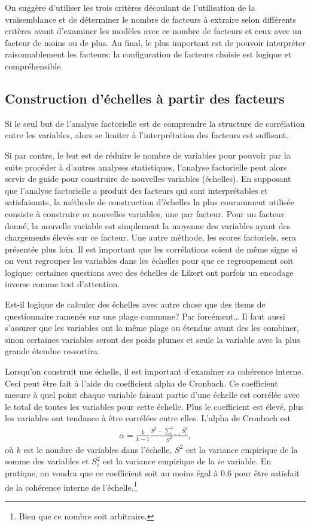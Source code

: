 \documentclass[
  11pt,
  letterpaper,
]{scrbook}
\theoremstyle{definition}
\theoremstyle{remark}
\begin{document}
On suggère d'utiliser les trois critères découlant de l'utilisation de
la vraisemblance et de déterminer le nombre de facteurs à extraire selon
différents critères avant d'examiner les modèles avec ce nombre de
facteurs et ceux avec un facteur de moins ou de plus. Au final, le plus
important est de pouvoir interpréter raisonnablement les facteurs: la
configuration de facteurs choisie est logique et compréhensible.

\subsection{Construction d'échelles à partir des
facteurs}\label{construction-duxe9chelles-uxe0-partir-des-facteurs}

Si le seul but de l'analyse factorielle est de comprendre la structure
de corrélation entre les variables, alors se limiter à l'interprétation
des facteurs est suffisant.

Si par contre, le but est de réduire le nombre de variables pour pouvoir
par la suite procéder à d'autres analyses statistiques, l'analyse
factorielle peut alors servir de guide pour construire de nouvelles
variables (échelles). En supposant que l'analyse factorielle a produit
des facteurs qui sont interprétables et satisfaisants, la méthode de
construction d'échelles la plus couramment utilisée consiste à
construire \(m\) nouvelles variables, une par facteur. Pour un facteur
donné, la nouvelle variable est simplement la moyenne des variables
ayant des chargements élevés sur ce facteur. Une autre méthode, les
scores factoriels, sera présentée plus loin. Il est important que les
corrélations soient de même signe si on veut regrouper les variables
dans les échelles pour que ce regroupement soit logique: certaines
questions avec des échelles de Likert ont parfois un encodage inverse
comme test d'attention.

Est-il logique de calculer des échelles avec autre chose que des items
de questionnaire ramenés sur une plage commune? Par forcément\ldots{} Il
faut aussi s'assurer que les variables ont la même plage ou étendue
avant des les combiner, sinon certaines variables seront des poids
plumes et seule la variable avec la plus grande étendue ressortira.

Lorsqu'on construit une échelle, il est important d'examiner sa
cohérence interne. Ceci peut être fait à l'aide du coefficient alpha de
Cronbach. Ce coefficient mesure à quel point chaque variable faisant
partie d'une échelle est corrélée avec le total de toutes les variables
pour cette échelle. Plus le coefficient est élevé, plus les variables
ont tendance à être corrélées entre elles. L'alpha de Cronbach est
\begin{align*}
\alpha=\frac{k}{k-1} \frac{S^2-\sum_{i=1}^k S_i^2}{S^2}, 
\end{align*} où \(k\) est le nombre de variables dans l'échelle, \(S^2\)
est la variance empirique de la somme des variables et \(S_i^2\) est la
variance empirique de la \(i\)e variable. En pratique, on voudra que ce
coefficient soit au moins égal à 0.6 pour être satisfait de la cohérence
interne de l'échelle.\footnote{Bien que ce nombre soit arbitraire.}
\end{document}
